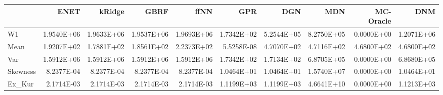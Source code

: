 \begin{tabular}{lrrrrrrrrr}
\toprule
{} &       ENET &     kRidge &       GBRF &       ffNN &        GPR &        DGN &        MDN &  MC-Oracle &        DNM \\
\midrule
W1       & 1.9540E+06 & 1.9633E+06 & 1.9537E+06 & 1.9693E+06 & 1.7342E+02 & 5.2544E+05 & 8.2750E+05 & 0.0000E+00 & 1.2071E+06 \\
Mean     & 1.9207E+02 & 1.7881E+02 & 1.8561E+02 & 2.2373E+02 & 5.5258E-08 & 4.7070E+02 & 4.7116E+02 & 4.6800E+02 & 4.6800E+02 \\
Var      & 1.5912E+06 & 1.5912E+06 & 1.5912E+06 & 1.5912E+06 & 1.7342E+02 & 1.7134E+02 & 6.8705E+05 & 0.0000E+00 & 6.8680E+05 \\
Skewness & 8.2377E-04 & 8.2377E-04 & 8.2377E-04 & 8.2377E-04 & 1.0464E+01 & 1.0464E+01 & 1.5740E+07 & 0.0000E+00 & 1.0464E+01 \\
Ex\_Kur   & 2.1714E-03 & 2.1714E-03 & 2.1714E-03 & 2.1714E-03 & 1.1199E+03 & 1.1199E+03 & 4.6641E+10 & 0.0000E+00 & 1.1213E+03 \\
\bottomrule
\end{tabular}

